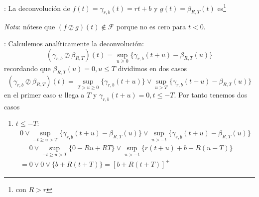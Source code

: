 \documentclass[xcolor={x11names}]{beamer}
\begin{document}
\begin{frame}{\secname: \subsecname}
    La deconvolución de
    $f(t)=\gamma_{r,b}(t)
    =rt+b$
    y $g(t)=\beta_{R,T}(t)$
    es\footnote{con $R>r$}
    \vfill
    \begin{figure}[h]
        \centering
        
    \end{figure}


    \vfill

    \emph{Nota}: nótese
    que $(f\oslash g)(t)
    \notin \mathcal{F}$
    porque no es cero para
    $t<0$.
\end{frame}



\begin{frame}{\secname: \subsecname}
    Calculemos analíticamente
    la deconvolución:
    \begin{equation*}
        (\gamma_{r,b}
        \oslash
        \beta_{R,T})(t)
        =\sup_{u \geq0}
        \{
        \gamma_{r,b}(t+u)
        - \beta_{R,T}(u)
        \}
    \end{equation*}
    recordando que
    $\beta_{R,T}(u)=0,
    u\leq T$ dividimos en dos
    casos
    \pause
    \begin{equation*}
        (\gamma_{r,b}
        \oslash
        \beta_{R,T})(t)
        =\sup_{T>u \geq0}
        \{
        \gamma_{r,b}(t+u)
        \}
        \lor
        \sup_{u>T}
        \{
        \gamma_{r,b}(t+u)
        -
        \beta_{R,T}(u)
        \}
    \end{equation*}
    \pause
    en el primer caso
    $u$ llega a $T$
    y
    $\gamma_{r,b}(t+u)=0,
    t\leq-T$.
    Por tanto tenemos dos casos
    \begin{enumerate}
        \item $t\leq-T$:
    \begin{multline*}
        0
        \lor
        \sup_{-t\geq u>T}
        \{
        \gamma_{r,b}(t+u)
        -
        \beta_{R,T}(u)
        \}
        \lor
        \sup_{u>-t}
        \{
        \gamma_{r,b}(t+u)
        -
        \beta_{R,T}(u)
        \}\\
        = 0
        \lor
        \sup_{-t\geq u>T}
        \{0-Ru+RT\}
        \lor
        \sup_{u>-t}\{ r(t+u)+b
        -R(u-T)\}\\
        =0\lor0\lor
        \{b+R(t+T)\}
        =[b+R(t+T)]^+
    \end{multline*}
    \end{enumerate}

\end{frame}
\end{document}

